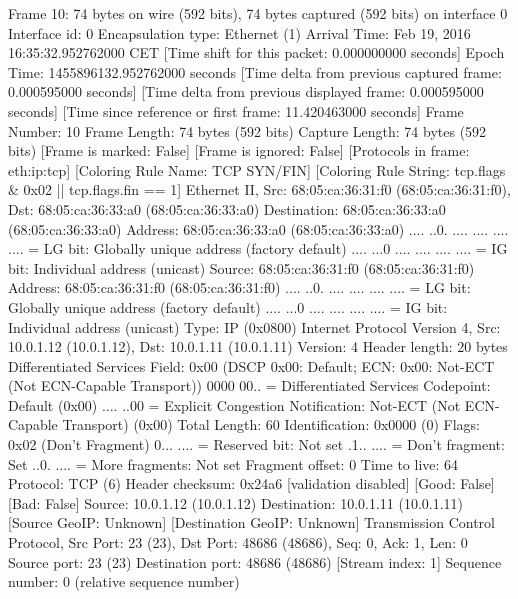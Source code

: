 Frame 10: 74 bytes on wire (592 bits), 74 bytes captured (592 bits) on interface 0
    Interface id: 0
    Encapsulation type: Ethernet (1)
    Arrival Time: Feb 19, 2016 16:35:32.952762000 CET
    [Time shift for this packet: 0.000000000 seconds]
    Epoch Time: 1455896132.952762000 seconds
    [Time delta from previous captured frame: 0.000595000 seconds]
    [Time delta from previous displayed frame: 0.000595000 seconds]
    [Time since reference or first frame: 11.420463000 seconds]
    Frame Number: 10
    Frame Length: 74 bytes (592 bits)
    Capture Length: 74 bytes (592 bits)
    [Frame is marked: False]
    [Frame is ignored: False]
    [Protocols in frame: eth:ip:tcp]
    [Coloring Rule Name: TCP SYN/FIN]
    [Coloring Rule String: tcp.flags & 0x02 || tcp.flags.fin == 1]
Ethernet II, Src: 68:05:ca:36:31:f0 (68:05:ca:36:31:f0), Dst: 68:05:ca:36:33:a0 (68:05:ca:36:33:a0)
    Destination: 68:05:ca:36:33:a0 (68:05:ca:36:33:a0)
        Address: 68:05:ca:36:33:a0 (68:05:ca:36:33:a0)
        .... ..0. .... .... .... .... = LG bit: Globally unique address (factory default)
        .... ...0 .... .... .... .... = IG bit: Individual address (unicast)
    Source: 68:05:ca:36:31:f0 (68:05:ca:36:31:f0)
        Address: 68:05:ca:36:31:f0 (68:05:ca:36:31:f0)
        .... ..0. .... .... .... .... = LG bit: Globally unique address (factory default)
        .... ...0 .... .... .... .... = IG bit: Individual address (unicast)
    Type: IP (0x0800)
Internet Protocol Version 4, Src: 10.0.1.12 (10.0.1.12), Dst: 10.0.1.11 (10.0.1.11)
    Version: 4
    Header length: 20 bytes
    Differentiated Services Field: 0x00 (DSCP 0x00: Default; ECN: 0x00: Not-ECT (Not ECN-Capable Transport))
        0000 00.. = Differentiated Services Codepoint: Default (0x00)
        .... ..00 = Explicit Congestion Notification: Not-ECT (Not ECN-Capable Transport) (0x00)
    Total Length: 60
    Identification: 0x0000 (0)
    Flags: 0x02 (Don't Fragment)
        0... .... = Reserved bit: Not set
        .1.. .... = Don't fragment: Set
        ..0. .... = More fragments: Not set
    Fragment offset: 0
    Time to live: 64
    Protocol: TCP (6)
    Header checksum: 0x24a6 [validation disabled]
        [Good: False]
        [Bad: False]
    Source: 10.0.1.12 (10.0.1.12)
    Destination: 10.0.1.11 (10.0.1.11)
    [Source GeoIP: Unknown]
    [Destination GeoIP: Unknown]
Transmission Control Protocol, Src Port: 23 (23), Dst Port: 48686 (48686), Seq: 0, Ack: 1, Len: 0
    Source port: 23 (23)
    Destination port: 48686 (48686)
    [Stream index: 1]
    Sequence number: 0    (relative sequence number)
